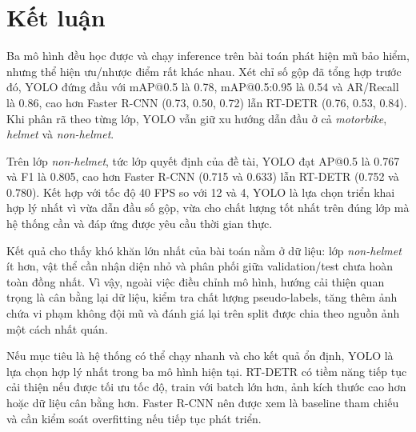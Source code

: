 \section{Kết luận}

Ba mô hình đều học được và chạy inference trên bài toán phát hiện mũ bảo hiểm, nhưng thể hiện ưu/nhược điểm rất khác nhau. Xét chỉ số gộp đã tổng hợp trước đó, YOLO đứng đầu với mAP@0.5 là 0.78, mAP@0.5:0.95 là 0.54 và AR/Recall là 0.86, cao hơn Faster R-CNN (0.73, 0.50, 0.72) lẫn RT-DETR (0.76, 0.53, 0.84). Khi phân rã theo từng lớp, YOLO vẫn giữ xu hướng dẫn đầu ở cả \textit{motorbike}, \textit{helmet} và \textit{non-helmet}.

Trên lớp \textit{non-helmet}, tức lớp quyết định của đề tài, YOLO đạt AP@0.5 là 0.767 và F1 là 0.805, cao hơn Faster R-CNN (0.715 và 0.633) lẫn RT-DETR (0.752 và 0.780). Kết hợp với tốc độ 40 FPS so với 12 và 4, YOLO là lựa chọn triển khai hợp lý nhất vì vừa dẫn đầu số gộp, vừa cho chất lượng tốt nhất trên đúng lớp mà hệ thống cần và đáp ứng được yêu cầu thời gian thực.

Kết quả cho thấy khó khăn lớn nhất của bài toán nằm ở dữ liệu: lớp \textit{non-helmet} ít hơn, vật thể cần nhận diện nhỏ và phân phối giữa validation/test chưa hoàn toàn đồng nhất. Vì vậy, ngoài việc điều chỉnh mô hình, hướng cải thiện quan trọng là cân bằng lại dữ liệu, kiểm tra chất lượng pseudo-labels, tăng thêm ảnh chứa vi phạm không đội mũ và đánh giá lại trên split được chia theo nguồn ảnh một cách nhất quán.

Nếu mục tiêu là hệ thống có thể chạy nhanh và cho kết quả ổn định, YOLO là lựa chọn hợp lý nhất trong ba mô hình hiện tại. RT-DETR có tiềm năng tiếp tục cải thiện nếu được tối ưu tốc độ, train với batch lớn hơn, ảnh kích thước cao hơn hoặc dữ liệu cân bằng hơn. Faster R-CNN nên được xem là baseline tham chiếu và cần kiểm soát overfitting nếu tiếp tục phát triển.
